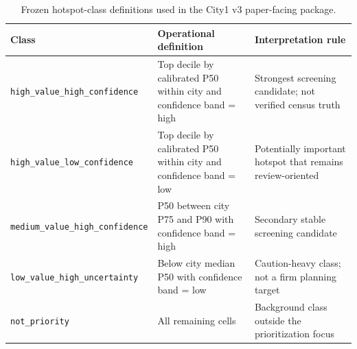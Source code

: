 \begin{table}[H]
\centering
\small
\caption{Frozen hotspot-class definitions used in the City1 v3 paper-facing package.}
\label{tab:s2-hotspot-classes}
\begin{tabular}{p{3.2cm}p{5.2cm}p{5.2cm}}
\toprule
Class & Operational definition & Interpretation rule \\
\midrule
\texttt{high\_value\_high\_confidence} & Top decile by calibrated P50 within city and confidence band = high & Strongest screening candidate; not verified census truth \\
\texttt{high\_value\_low\_confidence} & Top decile by calibrated P50 within city and confidence band = low & Potentially important hotspot that remains review-oriented \\
\texttt{medium\_value\_high\_confidence} & P50 between city P75 and P90 with confidence band = high & Secondary stable screening candidate \\
\texttt{low\_value\_high\_uncertainty} & Below city median P50 with confidence band = low & Caution-heavy class; not a firm planning target \\
\texttt{not\_priority} & All remaining cells & Background class outside the prioritization focus \\
\bottomrule
\end{tabular}
\end{table}

